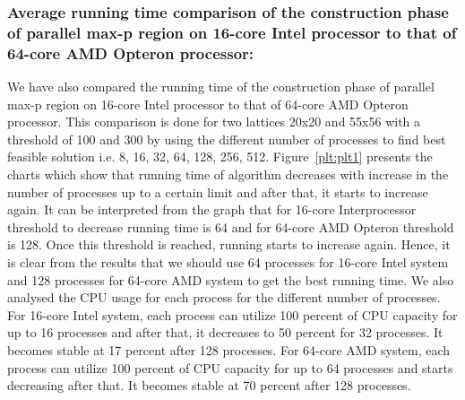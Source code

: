 \documentclass[conference]{IEEEtran}
\begin{document}
\subsubsection*{Average running time comparison of the construction phase of parallel max-p
region on 16-core Intel processor to that of 64-core AMD Opteron processor:}
We have also compared the running time of the construction phase of parallel max-p
region on 16-core Intel processor to that of 64-core AMD Opteron processor. This
comparison is done for two lattices 20x20 and 55x56 with a threshold of 100 and
300 by using the different number of processes to find best feasible solution i.e.
8, 16, 32, 64, 128, 256, 512. Figure~\ref{plt:plt1} presents the charts which
show that running time of algorithm decreases with increase in the number of
processes up to a certain limit and after that, it starts to increase again. It can
be interpreted from the graph that for 16-core Interprocessor threshold to
decrease running time is 64 and for 64-core AMD Opteron threshold is 128. Once
this threshold is reached, running starts to increase again. Hence, it is clear
from the results that we should use 64 processes for 16-core Intel system and
128 processes for 64-core AMD system to get the best running time. We also
analysed the CPU usage for each process for the different number of processes. For
16-core Intel system, each process can utilize 100 percent of CPU
capacity for up to 16 processes and after that, it decreases to 50 percent for 32
processes. It becomes stable at 17 percent after 128 processes. For 64-core AMD
system, each process can utilize 100 percent of CPU capacity for up to 64
processes and starts decreasing after that. It becomes stable at 70 percent
after 128 processes.
\end{document}
